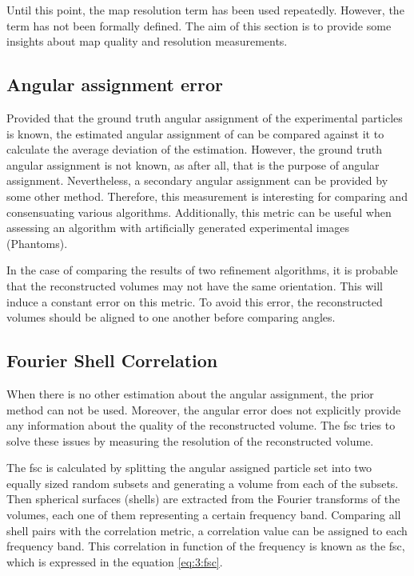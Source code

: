 \documentclass[../main.tex]{subfiles}
\begin{document}
Until this point, the map resolution term has been used repeatedly. However, the term has not been formally defined. The aim of this section is to provide some insights about map quality and resolution measurements.

\subsection{Angular assignment error}
Provided that the ground truth angular assignment of the experimental particles is known, the estimated angular assignment of can be compared against it to calculate the average deviation of the estimation. However, the ground truth angular assignment is not known, as after all, that is the purpose of angular assignment. Nevertheless, a secondary angular assignment can be provided by some other method. Therefore, this measurement is interesting for comparing and consensuating various algorithms. Additionally, this metric can be useful when assessing an algorithm with artificially generated experimental images (Phantoms).

In the case of comparing the results of two refinement algorithms, it is probable that the reconstructed volumes may not have the same orientation. This will induce a constant error on this metric. To avoid this error, the reconstructed volumes should be aligned to one another before comparing angles.

\subsection{Fourier Shell Correlation}
When there is no other estimation about the angular assignment, the prior method can not be used. Moreover, the angular error does not explicitly provide any information about the quality of the reconstructed volume. The \gls{fsc} tries to solve these issues by measuring the resolution of the reconstructed volume.

The \gls{fsc} is calculated by splitting the angular assigned particle set into two equally sized random subsets and generating a volume from each of the subsets. Then spherical surfaces (shells) are extracted from the Fourier transforms of the volumes, each one of them representing a certain frequency band. Comparing all shell pairs with the correlation metric, a correlation value can be assigned to each frequency band. This correlation in function of the frequency is known as the \gls{fsc}, which is expressed in the equation \eqref{eq:3:fsc}.
\end{document}
